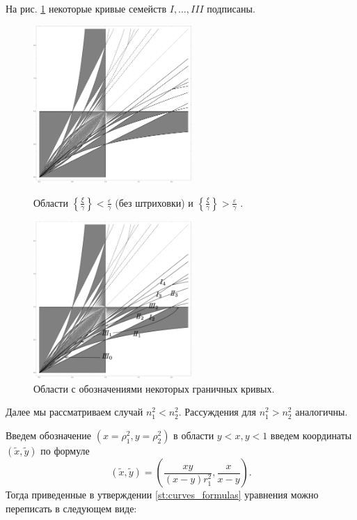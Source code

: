 На рис. \ref{fig:pt10:_B1_lattice_labeled} некоторые кривые семейств $I, \ldots, III$ подписаны. 
\begin{figure}[!htb]
\centering
\includegraphics[width=6cm]{images/ch4/section3_circular/B1_lattice.png}
    \caption{Области $\left\{ \frac{\xi}{\gamma} \right\} < \frac{\varepsilon}{\gamma}$ (без штриховки) и  $\left\{ \frac{\xi}{\gamma} \right\} > \frac{\varepsilon}{\gamma}$ .}
    \label{fig:pt10:_B1_lattice}
\endminipage\hfill
{}
\centering
\includegraphics[width=6cm]{images/ch4/section3_circular/B1_lattice_labeled.pdf}
    \caption{Области с обозначениями некоторых граничных кривых.}
    \label{fig:pt10:_B1_lattice_labeled}
\endminipage\hfill
\end{figure}


Далее мы рассматриваем случай $n_1^2 < n_2^2$. Рассуждения для $n_1^2 > n_2^2$ аналогичны.

Введем обозначение $(x=\rho_1^2, y=\rho_2^2)$ в области $y < x, y < 1$ введем координаты $(\widetilde{x}, \widetilde{y})$ по формуле 
\begin{equation}
(\widetilde{x}, \widetilde{y}) = \left(\frac{x y }{(x-y) r_1^2}, \frac{x}{x-y}\right).
\label{eq:coord_change}
\end{equation}
Тогда приведенные в утверждении \ref{st:curves_formulas} уравнения можно переписать в следующем виде:

